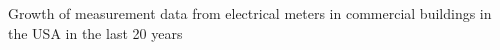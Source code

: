 Growth of measurement data from electrical meters in commercial buildings in the USA in the last 20 years
\label{fig:datagrowth}